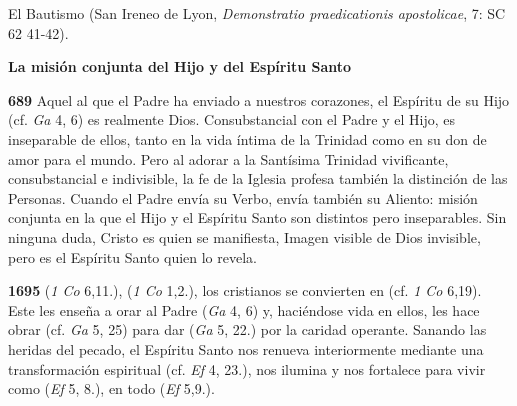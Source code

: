 \begin{body}
\begin{body}
El Bautismo  (San Ireneo de Lyon, \emph{Demonstratio praedicationis apostolicae}, 7: SC 62 41-42).

\textbf{La misión conjunta del Hijo y del Espíritu Santo}

\textbf{689} Aquel al que el Padre ha enviado a nuestros corazones, el Espíritu de su Hijo (cf. \emph{Ga} 4, 6) es realmente Dios. Consubstancial con el Padre y el Hijo, es inseparable de ellos, tanto en la vida íntima de la Trinidad como en su don de amor para el mundo. Pero al adorar a la Santísima Trinidad vivificante, consubstancial e indivisible, la fe de la Iglesia profesa también la distinción de las Personas. Cuando el Padre envía su Verbo, envía también su Aliento: misión conjunta en la que el Hijo y el Espíritu Santo son distintos pero inseparables. Sin ninguna duda, Cristo es quien se manifiesta, Imagen visible de Dios invisible, pero es el Espíritu Santo quien lo revela.

\textbf{1695}  (\emph{1 Co} 6,11.),  (\emph{1 Co} 1,2.), los cristianos se convierten en  (cf. \emph{1 Co} 6,19). Este  les enseña a orar al Padre (\emph{Ga} 4, 6) y, haciéndose vida en ellos, les hace obrar (cf. \emph{Ga} 5, 25) para dar  (\emph{Ga} 5, 22.) por la caridad operante. Sanando las heridas del pecado, el Espíritu Santo nos renueva interiormente mediante una transformación espiritual (cf. \emph{Ef} 4, 23.), nos ilumina y nos fortalece para vivir como  (\emph{Ef} 5, 8.),  en todo (\emph{Ef} 5,9.).


\end{body}
\end{body}
